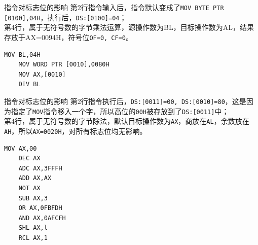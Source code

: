\documentclass[11pt]{SEU-Digital-Report}
\begin{document}
\begin{analyze}{指令对标志位的影响}{}
    第2行指令输入后，指令默认变成了\texttt{MOV BYTE PTR [0100],04H}，执行后，\texttt{DS:[0100]=04}；\\
    第4行，属于无符号数的字节乘法运算，源操作数为BL，目标操作数为AL，结果存放于AX=0094H，符号位\texttt{OF=0, CF=0}。
\end{analyze}

\begin{lstlisting}[language={[x86masm]Assembler},title=code3]
    MOV BL,04H
    MOV WORD PTR [0010],0080H
    MOV AX,[0010]
    DIV BL
\end{lstlisting}

\begin{analyze}{指令对标志位的影响}{}
    第2行指令执行后，\texttt{DS:[0011]=00, DS:[0010]=80}，这是因为指定了\texttt{MOV}指令移入一个字，所以高位的\texttt{00H}被存放到了\texttt{DS:[0011]}中；\\
    第4行，属于无符号数的字节除法，默认目标操作数为\texttt{AX}，商放在\texttt{AL}，余数放在\texttt{AH}，所以\texttt{AX=0020H}，对所有标志位均无影响。
\end{analyze}

\begin{lstlisting}[language={[x86masm]Assembler},title=code4]
    MOV AX,00
    DEC AX
    ADC AX,3FFFH
    ADD AX,AX
    NOT AX
    SUB AX,3
    OR AX,0FBFDH
    AND AX,0AFCFH
    SHL AX,l
    RCL AX,1   
\end{lstlisting}
\end{document}
